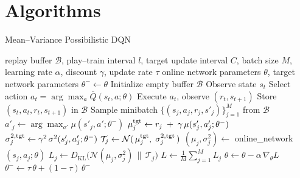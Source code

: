 \documentclass[11pt,a4paper]{report}
\begin{document}



\appendix

\chapter{Algorithms}

\label{appendix:algorithms}

\begin{algorithm}[ht]
\caption{Mean–Variance Possibilistic DQN}
\label{alg:mvpdqn}
\begin{algorithmic}[1]
\Require replay buffer $\mathcal B$, play–train interval $l$, target update interval $C$, batch size $M$, learning rate $\alpha$, discount $\gamma$, update rate $\tau$  
\Ensure online network parameters $\theta$, target network parameters $\theta^- \gets \theta$
\State Initialize empty buffer $\mathcal B$
  \State Observe state $s_t$
  \State Select action \( a_t = \arg\max_a \bar Q(s_t,a;\theta) \)
  \State Execute $a_t$, observe $(r_t, s_{t+1})$
  \State Store $(s_t,a_t,r_t,s_{t+1})$ in $\mathcal B$
    \State Sample minibatch $\{(s_j,a_j,r_j,s'_j)\}_{j=1}^M$ from $\mathcal B$
      \State $a'_j \gets \arg\max_{a'} \mu(s'_j,a';\theta^-)$
      \State $\mu^{\rm tgt}_j \gets r_j \;+\;\gamma\,\mu(s'_j,a'_j;\theta^-)$
      \State $\sigma^{2,\rm tgt}_j \gets \gamma^2\,\sigma^2(s'_j,a'_j;\theta^-)$
      \State $\mathcal T_j \gets \mathcal N(\,\mu^{\rm tgt}_j,\;\sigma^{2,\rm tgt}_j\,)$
      \State $(\mu_j,\sigma^2_j)\gets$ online\_network$(s_j,a_j;\theta)$
      \State $L_j \gets D_{\mathrm{KL}}\!\bigl(\mathcal N(\mu_j,\sigma^2_j)\,\|\,\mathcal T_j\bigr)$
    \EndFor
    \State $L \gets \tfrac{1}{M}\sum_{j=1}^M L_j$
    \State $\theta \gets \theta - \alpha\,\nabla_\theta L$
    \State $\theta^- \gets \tau\,\theta + (1 - \tau)\,\theta^-$
  \EndIf
\EndFor
\end{algorithmic}
\end{algorithm}
\end{document}

